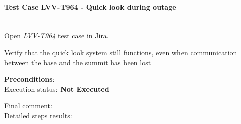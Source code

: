 \documentclass[DM,lsstdraft,STR,toc]{lsstdoc}
\begin{document}
\paragraph{Test Case LVV-T964 - Quick look during outage
 }\mbox{}\\

Open  \href{https://jira.lsstcorp.org/secure/Tests.jspa#/testCase/LVV-T964}{\textit{ LVV-T964 } }
test case in Jira.

Verify that the quick look system still functions, even when
communication between the base and the summit has been lost


\textbf{ Preconditions}:\\


Execution status: {\bf Not Executed }

Final comment:\\


Detailed steps results:
\end{document}
